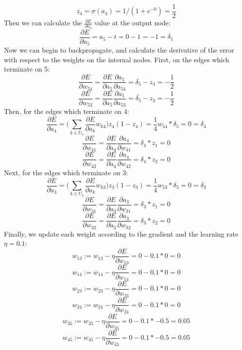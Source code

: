 \documentclass{article}
\begin{document}
\begin{enumerate}
            $$ z_4 = \sigma(a_4) = 1/(1+e^{-0}) = \frac{1}{2} $$
            Then we can calculate the $\frac{\partial E}{\partial a_5}$ value at the output node:
            $$ \frac{\partial E}{\partial a_5} = a_5 - t = 0 - 1 = -1 = \delta_5 $$
            Now we can begin to backpropagate, and calculate the derivative of the error with
            respect to the weights on the internal nodes. First, on the edges which terminate on 5:
            $$ \frac{\partial E}{\partial w_{54}} = \frac{\partial E}{\partial a_5} \frac{\partial a_5}{\partial a_{54}}
                = \delta_5 - z_4 = -\frac{1}{2}$$
            $$ \frac{\partial E}{\partial w_{53}} = \frac{\partial E}{\partial a_5} \frac{\partial a_5}{\partial a_{53}}
                = \delta_5 - z_3 = -\frac{1}{2}$$
            Then, for the edges which terminate on 4:
            $$ \frac{\partial E}{\partial a_4} = \Bigg( \sum_{k \in U_4} \frac{\partial E}{\partial a_k} w_{k4}\Bigg) z_4 (1 - z_4)
                = \frac{1}{4} w_{54} * \delta_5 = 0 = \delta_4 $$
            $$ \frac{\partial E}{\partial w_{41}} = \frac{\partial E}{\partial a_4} \frac{\partial a_4}{\partial w_{41}}
                = \delta_4 * z_1 = 0 $$
            $$ \frac{\partial E}{\partial w_{42}} = \frac{\partial E}{\partial a_4} \frac{\partial a_4}{\partial w_{42}}
                = \delta_4 * z_2 = 0 $$
            Next, for the edges which terminate on 3:
            $$ \frac{\partial E}{\partial a_3} = \Bigg( \sum_{k \in U_3} \frac{\partial E}{\partial a_k} w_{k3}\Bigg)  z_3 (1 - z_3)
                = \frac{1}{4} w_{53} * \delta_5 = 0 = \delta_3 $$
            $$ \frac{\partial E}{\partial w_{31}} = \frac{\partial E}{\partial a_3} \frac{\partial a_3}{\partial w_{31}}
                = \delta_3 * z_1 = 0 $$
            $$ \frac{\partial E}{\partial w_{32}} = \frac{\partial E}{\partial a_3} \frac{\partial a_3}{\partial w_{32}}
                = \delta_3 * z_2 = 0 $$
            Finally, we update each weight according to the gradient and the learning rate $\eta = 0.1$:
            $$ w_{13} := w_{13} - \eta \frac{\partial E}{\partial w_{13}} = 0 - 0.1 * 0  = 0 $$
            $$ w_{14} := w_{14} - \eta \frac{\partial E}{\partial w_{14}} = 0 - 0.1 * 0  = 0 $$
            $$ w_{23} := w_{23} - \eta \frac{\partial E}{\partial w_{23}} = 0 - 0.1 * 0  = 0 $$
            $$ w_{24} := w_{24} - \eta \frac{\partial E}{\partial w_{24}} = 0 - 0.1 * 0  = 0 $$
            $$ w_{35} := w_{35} - \eta \frac{\partial E}{\partial w_{35}} = 0 - 0.1 * -0.5  = 0.05 $$
            $$ w_{45} := w_{45} - \eta \frac{\partial E}{\partial w_{45}} = 0 - 0.1 * -0.5  = 0.05 $$
\end{enumerate}
\end{document}
